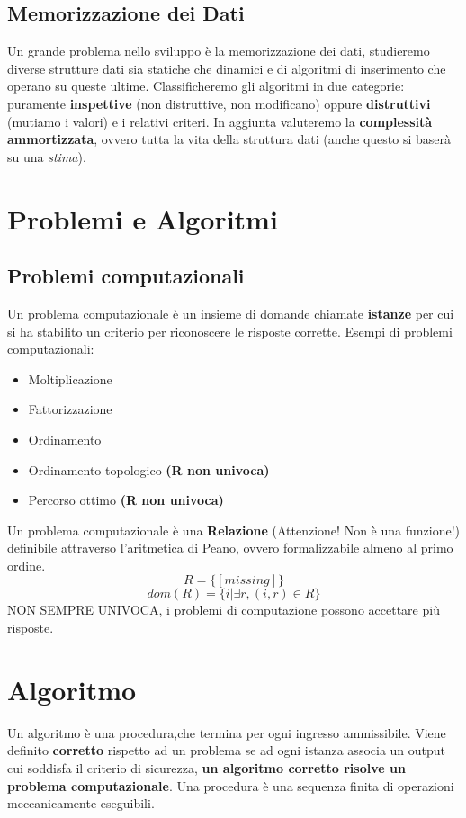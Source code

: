 \documentclass[twocolumn]{article}
\begin{document}
\subsection{Memorizzazione dei Dati}
Un grande problema nello sviluppo è la \hypertarget{dati}{memorizzazione dei dati}, studieremo diverse strutture dati sia statiche che dinamici e di algoritmi di inserimento che operano su queste ultime. Classificheremo gli algoritmi in due categorie: puramente \textbf{inspettive} (non distruttive, non modificano) oppure \textbf{distruttivi} (mutiamo i valori) e i relativi criteri. In aggiunta valuteremo la \textbf{complessità ammortizzata}, ovvero tutta la vita della struttura dati (anche questo si baserà su una \textit{stima}).

\section{Problemi e Algoritmi}
\subsection{Problemi computazionali}
Un problema computazionale è un insieme di domande chiamate \textbf{istanze} per cui si ha stabilito un criterio per riconoscere le risposte corrette. Esempi di problemi computazionali:
\begin{itemize}
    \item Moltiplicazione
    \item Fattorizzazione
    \item Ordinamento
    \item Ordinamento topologico \textbf{(R non univoca)}
    \item Percorso ottimo \textbf{(R non univoca)}
\end{itemize}
Un problema computazionale è una \textbf{Relazione} (Attenzione! Non è una funzione!) definibile attraverso l'aritmetica di Peano, ovvero formalizzabile almeno al primo ordine.
\[R = \{ [missing] \}\]
\[ dom(R) = \{ i | \exists r,(i,r) \in R \}\]
NON SEMPRE UNIVOCA, i problemi di computazione possono accettare più risposte.
\section{Algoritmo}
Un algoritmo è una procedura,che termina per ogni ingresso ammissibile. 
\newline Viene definito \textbf{corretto} rispetto ad un problema se ad ogni istanza associa un output cui soddisfa il criterio di sicurezza, \textbf{un algoritmo corretto risolve un problema computazionale}.
\newline Una procedura è una sequenza finita di operazioni meccanicamente eseguibili.
\end{document}
